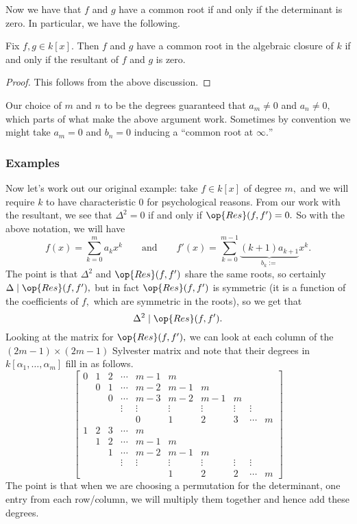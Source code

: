 \documentclass[../notes.tex]{subfiles}
\begin{document}
Now we have that $f$ and $g$ have a common root if and only if the determinant is zero. In particular, we have the following.
\begin{proposition}
	Fix $f,g\in k[x].$ Then $f$ and $g$ have a common root in the algebraic closure of $k$ if and only if the resultant of $f$ and $g$ is zero.
\end{proposition}
\begin{proof}
	This follows from the above discussion.
\end{proof}
\begin{remark}
	Our choice of $m$ and $n$ to be the degrees guaranteed that $a_m\ne0$ and $a_n\ne0,$ which parts of what make the above argument work. Sometimes by convention we might take $a_m=0$ and $b_n=0$ inducing a ``common root at $\infty.$''
\end{remark}

\subsubsection{Examples}
Now let's work out our original example: take $f\in k[x]$ of degree $m,$ and we will require $k$ to have characteristic $0$ for psychological reasons. From our work with the resultant, we see that $\Delta^2=0$ if and only if $\op{Res}(f,f')=0.$ So with the above notation, we will have
\[f(x)=\sum_{k=0}^ma_kx^k\qquad\text{and}\qquad f'(x)=\sum_{k=0}^{m-1}\underbrace{(k+1)a_{k+1}}_{b_k:=}x^k.\]
The point is that $\Delta^2$ and $\op{Res}(f,f')$ share the same roots, so certainly $\Delta\mid\op{Res}(f,f'),$ but in fact $\op{Res}(f,f')$ is symmetric (it is a function of the coefficients of $f,$ which are symmetric in the roots), so we get that
\[\Delta^2\mid\op{Res}(f,f').\]
Looking at the matrix for $\op{Res}(f,f'),$ we can look at each column of the $(2m-1)\times(2m-1)$ Sylvester matrix and note that their degrees in $k[\alpha_1,\ldots,\alpha_m]$ fill in as follows.
\[\begin{bmatrix}
	0 & 1 & 2 & \cdots & m-1    & m      &        &        &        &   \\
	  & 0 & 1 & \cdots & m-2    & m-1    & m      &        &        &   \\
	  &   & 0 & \cdots & m-3    & m-2    & m-1    & m      &        &   \\
	  &   &   & \vdots & \vdots & \vdots & \vdots & \vdots & \vdots &   \\
	  &   &   &        & 0      & 1      & 2      & 3      & \cdots & m \\
	1 & 2 & 3 & \cdots & m      &        &        &        &        &   \\
	  & 1 & 2 & \cdots & m-1    & m      &        &        &        &   \\
	  &   & 1 & \cdots & m-2    & m-1    & m      &        &        &   \\
	  &   &   & \vdots & \vdots & \vdots & \vdots & \vdots & \vdots &   \\
	  &   &   &        &        & 1      & 2      & 2      & \cdots & m
\end{bmatrix}\]
The point is that when we are choosing a permutation for the determinant, one entry from each row/column, we will multiply them together and hence add these degrees.
\end{document}
